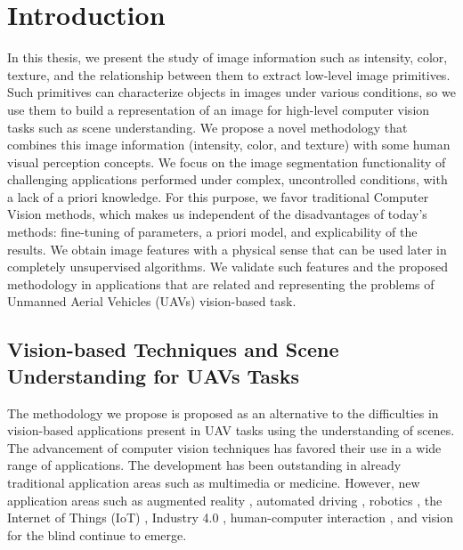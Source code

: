 \chapter*{Introduction}
In this thesis, we present the study of image information such as intensity, color, texture, and the relationship between them to extract low-level image primitives. Such primitives can characterize objects in images under various conditions, so we use them to build a representation of an image for high-level computer vision tasks such as scene understanding. We propose a novel methodology that combines this image information (intensity, color, and texture) with some human visual perception concepts. We focus on the image segmentation functionality of challenging applications performed under complex, uncontrolled conditions, with a lack of a priori knowledge. For this purpose, we favor traditional Computer Vision methods, which makes us independent of the disadvantages of today's methods: fine-tuning of parameters, a priori model, and explicability of the results. 
We obtain image features with a physical sense that can be used later in completely unsupervised algorithms. We validate such features and the proposed methodology in applications that are related and representing the problems of Unmanned Aerial Vehicles (UAVs) vision-based task.

\section*{Vision-based Techniques and Scene Understanding for UAVs Tasks}
The methodology we propose is proposed as an alternative to the difficulties in vision-based applications present in UAV tasks using the understanding of scenes.
The advancement of computer vision techniques has favored their use in a wide range of applications. The development has been outstanding in already traditional application areas such as multimedia or medicine. However, new application areas such as augmented reality \citep{AbuAlhaija.Mustikovela.ea:IJCV:2018}, automated driving \citep{Janai.Guney.ea:CGV:2020}, robotics \citep{Sankowski.Nowakowski:BOOK:2014}, the Internet of Things (IoT) \citep{Othman.Aydin:CICN:2017}, Industry 4.0 \citep{Zhong.Xu.ea:ENG:2017}, human-computer interaction \citep{Ke.Liu.ea:BOOK5:2018}, and vision for the blind \citep{Ahmed.Balasubramanian.ea:IUI:2020} continue to emerge.

